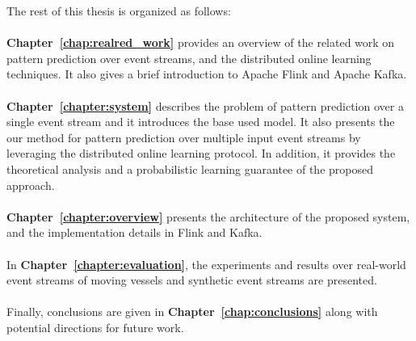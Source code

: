 \par The rest of this thesis is organized as follows:\\
\\
\textbf{Chapter~\ref{chap:realred_work}} provides an overview of the related work on pattern prediction over event streams, and the distributed online learning techniques. It also gives a brief introduction to Apache Flink and Apache Kafka.
\\
\\
\textbf{Chapter~\ref{chapter:system}} describes the problem of pattern prediction over a single event stream and it introduces the base used model. It also presents the our method for pattern prediction over multiple input event streams by leveraging the distributed online learning protocol. In addition, it provides the theoretical analysis and a probabilistic learning guarantee of the proposed approach.  
\\
\\
\textbf{Chapter~\ref{chapter:overview}}  presents the architecture of the proposed system, and the implementation details in Flink and Kafka.
\\
\\
In \textbf{Chapter~\ref{chapter:evaluation}}, the experiments and results over real-world event streams of moving vessels and synthetic event streams are presented.
\\
\\
Finally, conclusions are given in \textbf{Chapter~\ref{chap:conclusions}} along with potential directions for future work.






